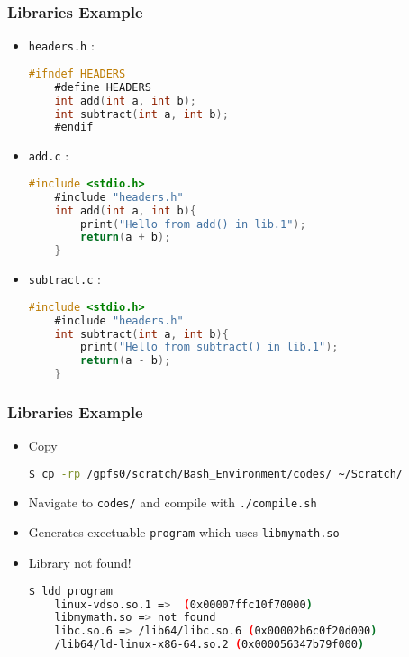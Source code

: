 \documentclass{beamer}
\newcommand{\code}[1]{\colorbox{codegray}{\texttt{#1}}}
\begin{document}
\begin{frame}[fragile]
\frametitle{Libraries Example}
\begin{itemize}
    \item \code{headers.h} : 
    \begingroup
    \scriptsize
    \begin{lstlisting}[backgroundcolor = \color{codegray}, language = C, showstringspaces=false]
    #ifndef HEADERS
    #define HEADERS
    int add(int a, int b);
    int subtract(int a, int b);
    #endif
    \end{lstlisting}
    \endgroup
    
    \item \code{add.c} : 
    \begingroup
    \scriptsize
    \begin{lstlisting}[backgroundcolor = \color{codegray}, language = C, showstringspaces=false]
    #include <stdio.h>
    #include "headers.h"
    int add(int a, int b){
        print("Hello from add() in lib.1");
        return(a + b);
    }
    \end{lstlisting}
    \endgroup
    
    
    \item \code{subtract.c} : 
    \begingroup
    \scriptsize
    \begin{lstlisting}[backgroundcolor = \color{codegray}, language = C, showstringspaces=false]
    #include <stdio.h>
    #include "headers.h"
    int subtract(int a, int b){
        print("Hello from subtract() in lib.1");
        return(a - b);
    }
    \end{lstlisting}
    \endgroup
\end{itemize}
\end{frame}


\begin{frame}[fragile]
\frametitle{Libraries Example}
\begin{itemize}
    \item Copy 
    \begingroup
    \scriptsize
    \begin{lstlisting}[backgroundcolor = \color{codegray}, language = Bash, showstringspaces=false]
    $ cp -rp /gpfs0/scratch/Bash_Environment/codes/ ~/Scratch/
    \end{lstlisting}
    \endgroup
    \pause

    \item Navigate to \code{codes/} and compile with \code{./compile.sh} 
    \pause

    \item Generates exectuable \code{program} which uses \code{libmymath.so}
    \pause

    \item Library not found!
    \begingroup
    \scriptsize
    \begin{lstlisting}[backgroundcolor = \color{codegray}, language = Bash, showstringspaces=false]
    $ ldd program
	linux-vdso.so.1 =>  (0x00007ffc10f70000)
	libmymath.so => not found
	libc.so.6 => /lib64/libc.so.6 (0x00002b6c0f20d000)
	/lib64/ld-linux-x86-64.so.2 (0x000056347b79f000)
    \end{lstlisting}
    \endgroup
\end{itemize}
\end{frame}
\end{document}
